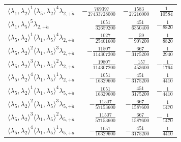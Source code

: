\begin{longtable}{@{}lrrr@{}}
$\langle\lambda_1,\lambda_2\rangle^{1}\langle\lambda_5,\lambda_2\rangle^{4}\lambda_{2,+\dot a}$ & $-\frac{769397}{27433728000}$ & $-\frac{1583}{27216000}$ & $\frac{1}{10584}$ \\
$\langle\lambda_1,\lambda_5\rangle^{5}\lambda_{2,+\dot a}$ & $\frac{1051}{32659200}$ & $\frac{451}{6350400}$ & $-\frac{1}{8820}$ \\
$\langle\lambda_5,\lambda_2\rangle^{1}\langle\lambda_1,\lambda_5\rangle^{4}\lambda_{2,+\dot a}$ & $-\frac{1027}{25401600}$ & $-\frac{59}{907200}$ & $\frac{1}{8820}$ \\
$\langle\lambda_5,\lambda_2\rangle^{2}\langle\lambda_1,\lambda_5\rangle^{3}\lambda_{2,+\dot a}$ & $-\frac{11507}{114307200}$ & $-\frac{667}{3175200}$ & $\frac{1}{2940}$ \\
$\langle\lambda_5,\lambda_2\rangle^{3}\langle\lambda_1,\lambda_5\rangle^{2}\lambda_{2,+\dot a}$ & $\frac{19807}{114307200}$ & $\frac{157}{453600}$ & $-\frac{1}{1764}$ \\
$\langle\lambda_5,\lambda_2\rangle^{4}\langle\lambda_1,\lambda_5\rangle^{1}\lambda_{2,+\dot a}$ & $-\frac{1051}{16329600}$ & $-\frac{451}{3175200}$ & $\frac{1}{4410}$ \\
$\langle\lambda_5,\lambda_2\rangle^{1}\langle\lambda_1,\lambda_5\rangle^{4}\lambda_{5,+\dot a}$ & $\frac{1051}{16329600}$ & $\frac{451}{3175200}$ & $-\frac{1}{4410}$ \\
$\langle\lambda_5,\lambda_2\rangle^{2}\langle\lambda_1,\lambda_5\rangle^{3}\lambda_{5,+\dot a}$ & $-\frac{11507}{57153600}$ & $-\frac{667}{1587600}$ & $\frac{1}{1470}$ \\
$\langle\lambda_5,\lambda_2\rangle^{3}\langle\lambda_1,\lambda_5\rangle^{2}\lambda_{5,+\dot a}$ & $\frac{11507}{57153600}$ & $\frac{667}{1587600}$ & $-\frac{1}{1470}$ \\
$\langle\lambda_5,\lambda_2\rangle^{4}\langle\lambda_1,\lambda_5\rangle^{1}\lambda_{5,+\dot a}$ & $-\frac{1051}{16329600}$ & $-\frac{451}{3175200}$ & $\frac{1}{4410}$ \\
\end{longtable}
